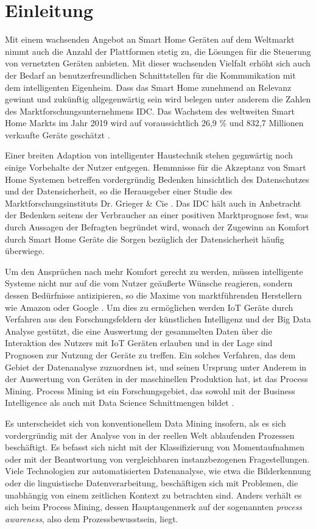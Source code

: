 \chapter{Einleitung}\label{chap:introduction}
Mit einem wachsenden Angebot an Smart Home Geräten auf dem Weltmarkt nimmt auch die Anzahl der Plattformen stetig zu, die Lösungen für die Steuerung von vernetzten Geräten anbieten. Mit dieser wachsenden Vielfalt erhöht sich auch der Bedarf an benutzerfreundlichen Schnittstellen für die Kommunikation mit dem intelligenten Eigenheim. Dass das Smart Home zunehmend an Relevanz gewinnt und zukünftig allgegenwärtig sein wird belegen unter anderem die Zahlen des Marktforschungsunternehmens IDC. Das Wachstem des weltweiten Smart Home Markts im Jahr 2019 wird auf voraussichtlich 26,9 \% und 832,7 Millionen verkaufte Geräte geschätzt \cite{IDC}.
 
Einer breiten Adaption von intelligenter Haustechnik stehen gegnwärtig noch einige Vorbehalte der Nutzer entgegen. Hemmnisse für die Akzeptanz von Smart Home Systemen betreffen vordergründig Bedenken hinsichtlich des Datenschutzes und der Datensicherheit, so die Herausgeber einer Studie des Marktforschungsinstituts Dr. Grieger \& Cie \cite{griegercie}. Das IDC hält auch in Anbetracht der Bedenken seitens der Verbraucher an einer positiven Marktprognose fest, was durch Aussagen der Befragten begründet wird, wonach der Zugewinn an Komfort durch Smart Home Geräte die Sorgen bezüglich der Datensicherheit häufig überwiege.
 
Um den Ansprüchen nach mehr Komfort gerecht zu werden, müssen intelligente Systeme nicht nur auf die vom Nutzer geäußerte Wünsche reagieren, sondern dessen Bedürfnisse antizipieren, so die Maxime von marktführenden Herstellern wie Amazon oder Google \cite{IoTGoogle}. Um dies zu ermöglichen werden IoT Geräte durch Verfahren aus den Forschungsfeldern der künstlichen Intelligenz und der Big Data Analyse gestützt, die eine Auswertung der gesammelten Daten über die Interaktion des Nutzers mit IoT Geräten erlauben und in der Lage sind Prognosen zur Nutzung der Geräte zu treffen. 
\newpage
Ein solches Verfahren, das dem Gebiet der Datenanalyse zuzuordnen ist, und seinen Ursprung unter Anderem in der Auswertung von Geräten in der maschinellen Produktion hat, ist das Process Mining. Process Mining ist ein Forschungsgebiet, das sowohl mit der Business Intelligence als auch mit Data Science Schnittmengen bildet \cite{PMinAction}. 

Es unterscheidet sich von konventionellem Data Mining insofern, als es sich vordergründig mit der Analyse von in der reellen Welt ablaufenden Prozessen beschäftigt. Es befasst sich nicht mit der Klassifizierung von Momentaufnahmen oder mit der Beantwortung von vergleichbaren instanzbezogenen Fragestellungen. Viele Technologien zur automatisierten Datenanalyse, wie etwa die Bilderkennung oder die linguistische Datenverarbeitung, beschäftigen sich mit Problemen, die unabhängig von einem zeitlichen Kontext zu betrachten sind. Anders verhält es sich beim Process Mining, dessen Hauptaugenmerk auf der sogenannten \textit{process awareness}, also dem Prozessbewusstsein, liegt.

